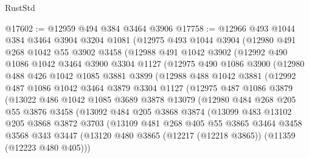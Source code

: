 \begin{lexlean}{RustStd}
\begin{coremodule}
{{{{{{{{{{{{{{{{{{{@17602 := @12959 @494 @384 @3464 @3906
@17758 := @12966
    @493
    @1044
    @384
    @3464
    @3904
    @3204
    @1081
    (@12975
      @493
      @1044
      @3904
      (@12980
        @491
        @268
        @1042
        @55
        @3902
        @3458
        (@12988
          @491
          @1042
          @3902
          (@12992
            @490
            @1086
            @1042
            @3464
            @3900
            @3304
            @1127
            (@12975
              @490
              @1086
              @3900
              (@12980
                @488
                @426
                @1042
                @1085
                @3881
                @3899
                (@12988
                  @488
                  @1042
                  @3881
                  (@12992
                    @487
                    @1086
                    @1042
                    @3464
                    @3879
                    @3304
                    @1127
                    (@12975
                      @487
                      @1086
                      @3879
                      (@13022
                        @486
                        @1042
                        @1085
                        @3689
                        @3878
                        @13079
                        (@12980
                          @484
                          @268
                          @205
                          @55
                          @3876
                          @3458
                          (@13092
                            @484
                            @205
                            @3868
                            @3874
                            (@13099
                              @483
                              @13102
                              @205
                              @3868
                              @3872
                              @3703
                              (@13109
                                @481
                                @268
                                @405
                                @55
                                @3865
                                @3464
                                @3458
                                @3568
                                @343
                                @3447
                                (@13120
                                  @480
                                  @3865
                                  (@12217 (@12218 @3865))
                                  (@11359 (@12223 @480 @405)))
}}}}}}}}}}}}}}}}}}}
\end{coremodule}
\end{lexlean}
